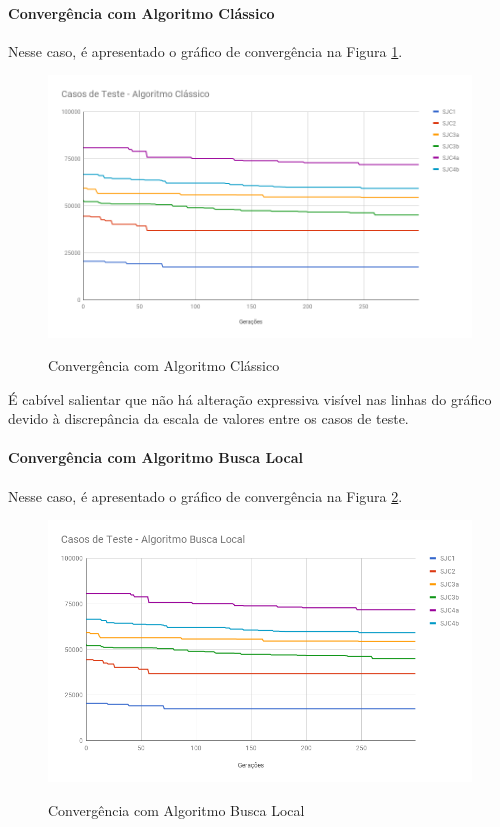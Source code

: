 	\paragraph{Convergência com Algoritmo Clássico}
	Nesse caso, é apresentado o gráfico de convergência na Figura \ref{fig:graf1}.
	\begin{figure}[h]
	 	\centering
	 	\includegraphics[scale = 0.5]{graf1.png}
		\label{fig:graf1}
	 	\caption{Convergência com Algoritmo Clássico}
	 \end{figure}

	 É cabível salientar que não há alteração expressiva visível nas linhas do gráfico devido à discrepância da escala de valores entre os casos de teste.

	\paragraph{Convergência com Algoritmo Busca Local}
	Nesse caso, é apresentado o gráfico de convergência na Figura \ref{fig:graf2}.
	\begin{figure}[h]
		\centering
		\includegraphics[scale = 0.5]{graf2.png}
		\label{fig:graf2}
		\caption{Convergência com Algoritmo Busca Local}
	 \end{figure}

